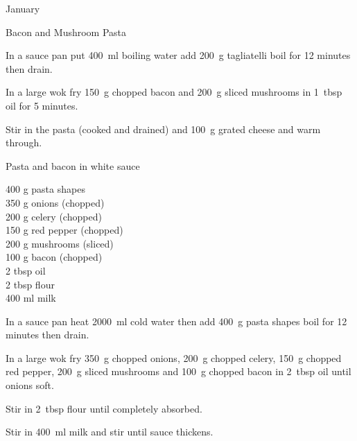 \begin{menu}{January}
\begin{recipe}{1}{Bacon and Mushroom Pasta}
\begin{ingredients}
		\end{ingredients}
	
    \begin{instructions}
    \item 
      In a
      sauce pan
      put
      400~ml  boiling water
      add
      200~g  tagliatelli
      boil for 12 minutes then drain.
    \item 
        In a large wok fry 150~g chopped bacon
        and
        200~g sliced mushrooms
        in
        1~tbsp  oil for 5 minutes.
      \item 
        Stir in the pasta (cooked and drained)
        and 100~g grated cheese
        and warm through.
      
    \end{instructions}
    \end{recipe}%
  
    \begin{recipe}{2}{Pasta and bacon in white sauce}%
		\begin{ingredients}
		400 g pasta shapes  \\
	350 g onions (chopped) \\
	200 g celery (chopped) \\
	150 g red pepper (chopped) \\
	200 g mushrooms (sliced) \\
	100 g bacon (chopped) \\
	2 tbsp oil  \\
	2 tbsp flour  \\
	400 ml milk  \\
	
		\end{ingredients}
	
    \begin{instructions}
    \item 
      In a sauce pan heat
      2000~ml  cold water then add
      400~g  pasta shapes
      boil for 12
      minutes then drain.
    \item 
        In a large wok fry
        350~g chopped onions,
        200~g chopped celery,
        150~g chopped red pepper,
        200~g sliced mushrooms
        and
        100~g chopped bacon
        in
        2~tbsp  oil
        until onions soft.
      \item 
        Stir in
        2~tbsp  flour
        until completely absorbed.
      \item 
        Stir in
        400~ml  milk
        and stir
        until sauce thickens.
      

\end{instructions}
\end{recipe}
\end{menu}
